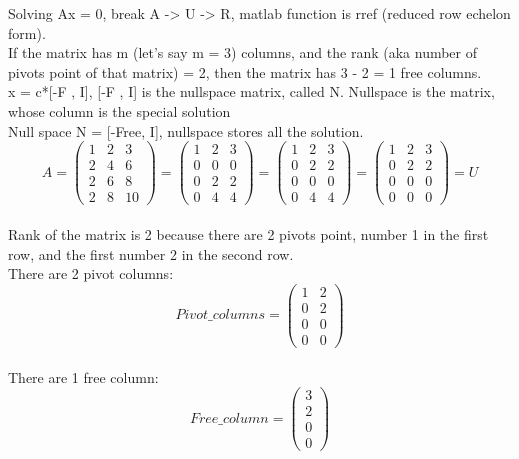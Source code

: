 \documentclass{article}
\begin{document}
Solving Ax = 0, break A -> U -> R, matlab function is rref (reduced row echelon form).
\\If the matrix has m (let's say m = 3) columns, and the rank (aka number of pivots point of that matrix) = 2, then the matrix has 3 - 2 = 1 free columns.
\\x = c*[-F , I], [-F , I] is the nullspace matrix, called N. Nullspace is the matrix, whose column is the special solution
\\Null space N = [-Free, I], nullspace stores all the solution.
\begin{equation}
A = 
\left({\begin{array}{ccc} 1 & 2 & 3 \\ 2 & 4 & 6 \\ 2 & 6 & 8 \\ 2 & 8 & 10 \end{array}}\right)=
\left({\begin{array}{ccc} 1 & 2 & 3 \\ 0 & 0 & 0 \\ 0 & 2 & 2 \\ 0 & 4 & 4 \end{array}}\right)=
\left({\begin{array}{ccc} 1 & 2 & 3 \\ 0 & 2 & 2 \\ 0 & 0 & 0  \\ 0 & 4 & 4 \end{array}}\right)=
\left({\begin{array}{ccc} 1 & 2 & 3 \\ 0 & 2 & 2 \\ 0 & 0 & 0  \\ 0 & 0 & 0 \end{array}}\right)
= U
\end{equation}
\\Rank of the matrix is 2 because there are 2 pivots point, number 1 in the first row, and the first number 2 in the second row.
\\There are 2 pivot columns:
\begin{equation}
Pivot\_columns = 
\left({\begin{array}{cc} 1 & 2 \\ 0 & 2 \\ 0 & 0 \\ 0 & 0 \end{array}}\right)
\end{equation}
\\There are 1 free column: 
\begin{equation}
Free\_column = 
\left({\begin{array}{cc} 3 \\ 2 \\ 0 \\ 0 \end{array}}\right)
\end{equation}
\end{document}
